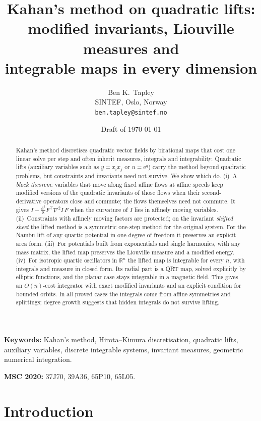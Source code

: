 \documentclass[11pt,a4paper]{article}
\title{Kahan's method on quadratic lifts:\\[2pt]
modified invariants, Liouville measures and\\ integrable maps in every dimension}
\author{Ben K.~Tapley\\[2pt]
\small SINTEF, Oslo, Norway\\
\small\texttt{ben.tapley@sintef.no}}
\date{Draft of \today}
\theoremstyle{definition}
\theoremstyle{remark}
\newcommand{\R}{\mathbb{R}}
\newcommand{\tr}{^{\!\top}}
\begin{document}
\maketitle

\begin{abstract}
Kahan's method discretises quadratic vector fields by birational maps that cost one linear solve per step
and often inherit measures, integrals and integrability. Quadratic lifts (auxiliary variables such as
$y=x_ix_j$ or $u=\mathrm e^{q}$) carry the method beyond quadratic problems, but constraints and invariants
need not survive. We show which do. (i)~A
\emph{block theorem}: variables that move along fixed affine flows at affine speeds keep modified versions of
the quadratic invariants of those flows when their second-derivative operators close and commute; the flows
themselves need not commute. It gives $I-\tfrac{h^2}{8}F\tr\nabla^2I\,F$ when the curvature of $I$ lies in
affinely moving variables. (ii)~Constraints with affinely moving factors are protected; on the invariant
\emph{shifted sheet} the lifted method is a symmetric one-step method for the original system. For the Nambu
lift of any quartic potential in one degree of freedom it preserves an explicit area form. (iii)~For
potentials built from exponentials and single harmonics, with any mass matrix, the lifted map preserves the
Liouville measure and a modified energy. (iv)~For isotropic quartic oscillators in $\R^n$ the lifted map is
integrable for every $n$, with integrals and measure in closed form. Its radial part is a QRT map,
solved explicitly by elliptic functions, and the planar case stays integrable in a magnetic field. This gives
an $O(n)$-cost integrator with exact modified invariants and an explicit condition for bounded orbits.
In all proved cases the integrals come from affine symmetries and splittings; degree growth suggests that hidden
integrals do not survive lifting.
\end{abstract}

\noindent\textbf{Keywords:} Kahan's method, Hirota--Kimura discretisation, quadratic lifts, auxiliary
variables, discrete integrable systems, invariant measures, geometric numerical integration.

\noindent\textbf{MSC 2020:} 37J70, 39A36, 65P10, 65L05.

\section{Introduction}\label{sec:intro}
\end{document}

